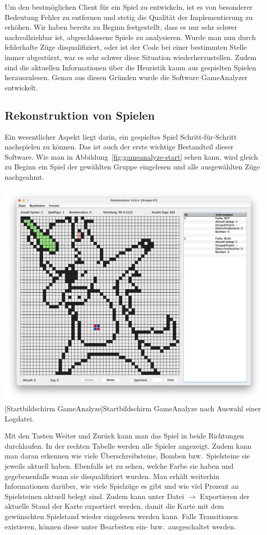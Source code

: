 Um den bestm\"oglichen Client f\"ur ein Spiel zu entwickeln, ist es von besonderer Bedeutung Fehler zu entfernen und stetig die Qualit\"at der Implementierung zu erh\"ohen.
Wir haben bereits zu Beginn festgestellt, dass es nur sehr schwer nachvollziehbar ist, abgeschlossene Spiele zu analysieren.
Wurde man nun durch fehlerhafte Z\"uge disqualifiziert, oder ist der Code bei einer bestimmten Stelle immer abgest\"urzt, war es sehr schwer diese Situation wiederherzustellen.
Zudem sind die aktuellen Informationen \"uber die Heuristik kaum aus gespielten Spielen herauszulesen.
Genau aus diesen Gr\"unden wurde die Software GameAnalyzer entwickelt.

\subsection{Rekonstruktion von Spielen}\label{subsec:rekonstruktion-von-spielen}
Ein wesentlicher Aspekt liegt darin, ein gespieltes Spiel Schritt-f\"ur-Schritt nachspielen zu k\"onnen.
Das ist auch der erste wichtige Bestandteil dieser Software.
Wie man in Abbildung~\ref{fig:gameanalyze-start} sehen kann, wird gleich zu Beginn ein Spiel der gew\"ahlten Gruppe eingelesen und alle ausgew\"ahlten Z\"uge nachgeahmt.

\vspace{1em}
\begin{minipage}{\linewidth}
    \centering
    \includegraphics[width=0.8\linewidth]{pics/startscreen}
    [Startbildschirm GameAnalyze]{Startbildschirm GameAnalyze nach Auswahl einer Logdatei.}
    \label{fig:gameanalyze-start}
\end{minipage}

Mit den Tasten Weiter und Zur\"uck kann man das Spiel in beide Richtungen durchlaufen.
In der rechten Tabelle werden alle Spieler angezeigt.
Zudem kann man daran erkennen wie viele \"Uberschreibsteine, Bomben bzw.\ Spielsteine sie jeweils aktuell haben.
Ebenfalls ist zu sehen, welche Farbe sie haben und gegebenenfalls wann sie disqualifiziert wurden.
Man erh\"alt weiterhin Informationen dar\"uber, wie viele Spielz\"uge es gibt und wie viel Prozent an Spielsteinen aktuell belegt sind.
Zudem kann unter Datei $\rightarrow$ Exportieren der aktuelle Stand der Karte exportiert werden, damit die Karte mit dem gew\"unschten Spielstand wieder eingelesen werden kann.
Falls Transitionen existieren, k\"onnen diese unter Bearbeiten ein- bzw.\ ausgeschaltet werden.

